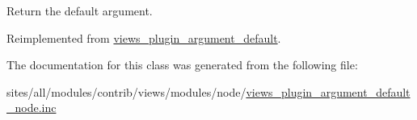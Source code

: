 Return the default argument. 

Reimplemented from \hyperlink{classviews__plugin__argument__default_8e67864f4a1ce20b12bc82afe1acd255}{views\_\-plugin\_\-argument\_\-default}.

The documentation for this class was generated from the following file:\begin{CompactItemize}
\item 
sites/all/modules/contrib/views/modules/node/\hyperlink{views__plugin__argument__default__node_8inc}{views\_\-plugin\_\-argument\_\-default\_\-node.inc}\end{CompactItemize}
